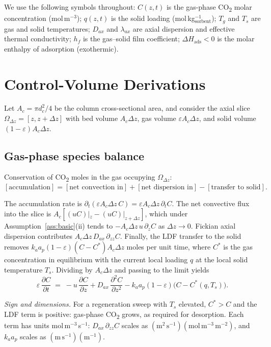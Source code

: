 \documentclass[a4paper,11pt]{amsart}
\theoremstyle{definition}
\begin{document}
We use the following symbols throughout: $C(z,t)$ is the gas-phase CO\textsubscript{2} molar concentration (mol\,m$^{-3}$); $q(z,t)$ is the solid loading (mol\,kg$^{-1}_{\text{sorbent}}$); $T_g$ and $T_s$ are gas and solid temperatures; $D_{ax}$ and $\lambda_{ax}$ are axial dispersion and effective thermal conductivity; $h_f$ is the gas--solid film coefficient; $\Delta H_{\text{ads}}<0$ is the molar enthalpy of adsorption (exothermic).

\section{Control-Volume Derivations}

Let $A_c=\pi d_c^2/4$ be the column cross-sectional area, and consider the axial slice $\Omega_{\Delta z}=[z,z+\Delta z]$ with bed volume $A_c\Delta z$, gas volume $\varepsilon A_c\Delta z$, and solid volume $(1-\varepsilon)A_c\Delta z$.

\subsection{Gas-phase species balance}\label{sec:gas-mass}

Conservation of CO\textsubscript{2} moles in the gas occupying $\Omega_{\Delta z}$:
\[
[\text{accumulation}] = [\text{net convection in}] + [\text{net dispersion in}] - [\text{transfer to solid}].
\]

The accumulation rate is $\partial_t(\varepsilon A_c\Delta z\,C)=\varepsilon A_c\Delta z\,\partial_t C$. The net convective flux into the slice is $A_c[(uC)|_z-(uC)|_{z+\Delta z}]$, which under Assumption~\ref{ass:basic}(ii) tends to $-A_c\Delta z\,u\,\partial_z C$ as $\Delta z\to 0$. Fickian axial dispersion contributes $A_c\Delta z\,D_{ax}\,\partial_{zz}C$. Finally, the LDF transfer to the solid removes $k_a a_p(1-\varepsilon)(C-C^\ast)A_c\Delta z$ moles per unit time, where $C^\ast$ is the gas concentration in equilibrium with the current local loading $q$ at the local solid temperature $T_s$. Dividing by $A_c\Delta z$ and passing to the limit yields
\begin{equation}\label{eq:gas-mass}
\varepsilon\,\frac{\partial C}{\partial t}
\;=\;
-u\,\frac{\partial C}{\partial z}
+ D_{ax}\,\frac{\partial^2 C}{\partial z^2}
- k_a a_p(1-\varepsilon)\bigl(C-C^\ast(q,T_s)\bigr).
\end{equation}

\emph{Sign and dimensions.} For a regeneration sweep with $T_s$ elevated, $C^\ast>C$ and the LDF term is positive: gas-phase CO\textsubscript{2} grows, as required for desorption. Each term has units mol\,m$^{-3}$\,s$^{-1}$: $D_{ax}\,\partial_{zz}C$ scales as $(\mathrm{m^2\,s^{-1}})(\mathrm{mol\,m^{-3}\,m^{-2}})$, and $k_a a_p$ scales as $(\mathrm{m\,s^{-1}})(\mathrm{m^{-1}})$.
\end{document}
